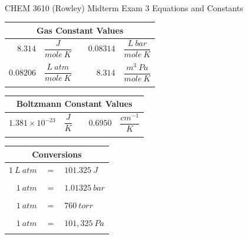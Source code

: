 \documentclass[12pt, letterpaper]{memoir}
\begin{document}
\newpage
\pagestyle{empty}

~
\vspace{-3em}
\begin{center}
	{\LARGE CHEM 3610 (Rowley) Midterm Exam 3 Equations and Constants}
\end{center}

\vspace{-1em}\noindent
\begin{minipage}{0.57\linewidth}
	\begin{mdframed}
		\begin{tabular}{rlcrl}
			\multicolumn{5}{c}{Gas Constant Values}                                       \\ \midrule
			$8.314$   & $\dfrac{J}{mole~K}$     &  & $0.08314$ & $\dfrac{L~bar}{mole~K}$  \\ \\
			$0.08206$ & $\dfrac{L~atm}{mole~K}$ &  & $8.314$   & $\dfrac{m^3~Pa}{mole~K}$ \\ \\
		\end{tabular}
		\begin{tabular}{rlcrl}
			\multicolumn{5}{c}{Boltzmann Constant Values}                                 \\ \midrule
			$1.381 \times 10^{-23}$ & $\dfrac{J}{K}$ &  & $0.6950$ & $\dfrac{cm^{-1}}{K}$ \\ \\
		\end{tabular}
	\end{mdframed}
\end{minipage}
\hspace{20pt}
\begin{minipage}{0.4\linewidth}
	\begin{mdframed}
		\begin{tabular}{rcl}
			\multicolumn{3}{c}{Conversions}  \\ \midrule
			$1~L~atm $ & $=$ & $101.325~J$   \\ \\
			$1~atm $   & $=$ & $1.01325~bar$ \\ \\
			$1~atm $   & $=$ & $760~torr$    \\ \\
			$1~atm $   & $=$ & $101,325~Pa$  \\ \\
		\end{tabular}
	\end{mdframed}
\end{minipage}
\end{document}
